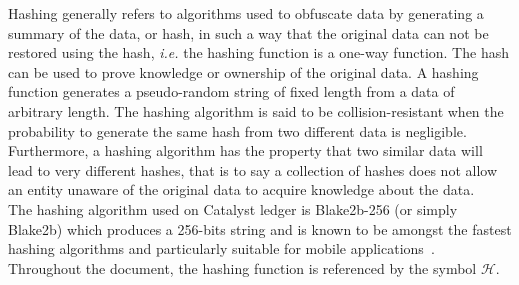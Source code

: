 Hashing generally refers to algorithms used to obfuscate data by generating a summary of the data, or hash, in such a way that the original data can not be restored using the hash, \textit{i.e.} the hashing function is a one-way function. The hash can be used to prove knowledge or ownership of the original data. A hashing function generates a pseudo-random string of fixed length from a data of arbitrary length. The hashing algorithm is said to be collision-resistant when the probability to generate the same hash from two different data is negligible. Furthermore, a hashing algorithm has the property that two similar data will lead to very different hashes, that is to say a collection of hashes does not allow an entity unaware of the original data to acquire knowledge about the data. \\ 

The hashing algorithm used on Catalyst ledger is Blake2b-256 (or simply Blake2b) which produces a 256-bits string and is known to be amongst the fastest hashing algorithms and particularly suitable for mobile applications~\cite{blake}. Throughout the document, the hashing function is referenced by the symbol $\mathcal{H}$.
